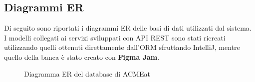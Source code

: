 \documentclass[11pt]{article} %
\begin{document}
\subsection{Diagrammi ER}

Di seguito sono riportati i diagrammi ER delle basi di dati utilizzati dal sistema. I modelli collegati ai servizi sviluppati con API REST sono stati ricreati utilizzando quelli ottenuti direttamente dall'ORM sfruttando IntelliJ, mentre quello della banca è stato creato con \textbf{Figma Jam}.

\begin{figure}[H]
\begin{center}
\caption{Diagramma ER del database di ACMEat}
\label{db:acmeat}
\end{center}
\end{figure}
\end{document}
